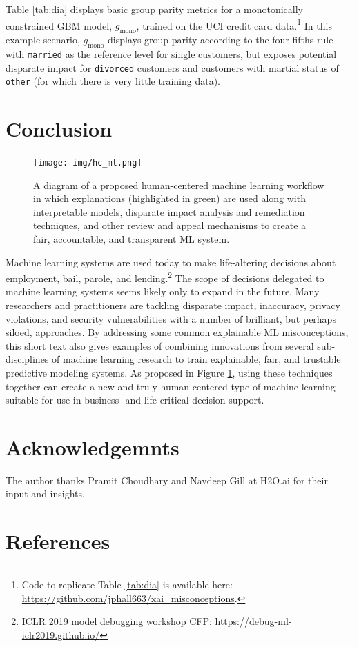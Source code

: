 \documentclass[fleqn]{article}
\begin{document}
Table \ref{tab:dia} displays basic group parity metrics for a monotonically constrained GBM model, $g_{\text{mono}}$, trained on the UCI credit card data.\footnote{Code to replicate Table \ref{tab:dia} is available here: \url{https://github.com/jphall663/xai_misconceptions}.} In this example scenario, $g_{\text{mono}}$ displays group parity according to the four-fifths rule with \texttt{married} as the reference level for single customers, but exposes potential disparate impact for \texttt{divorced} customers and customers with martial status of \texttt{other} (for which there is very little training data).

\section*{Conclusion}

\begin{figure}
	\begin{center}
		\texttt{[image: img/hc\_ml.png]}
		\caption{A diagram of a proposed human-centered machine learning workflow in which explanations (highlighted in green) are used along with interpretable models, disparate impact analysis and remediation techniques, and other review and appeal mechanisms to create a fair, accountable, and transparent ML system.}
		\label{fig:hc_ml}
	\end{center}
\end{figure}

Machine learning systems are used today to make life-altering decisions about employment, bail, parole, and lending.\footnote{ICLR 2019 model debugging workshop CFP: \url{https://debug-ml-iclr2019.github.io/}} The scope of decisions delegated to machine learning systems seems likely only to expand in the future. Many researchers and practitioners are tackling disparate impact, inaccuracy, privacy violations, and security vulnerabilities with a number of brilliant, but perhaps siloed, approaches. By addressing some common explainable ML misconceptions, this short text also gives examples of combining innovations from several sub-disciplines of machine learning research to train explainable, fair, and trustable predictive modeling systems. As proposed in Figure \ref{fig:hc_ml}, using these techniques together can create a new and truly human-centered type of machine learning suitable for use in business- and life-critical decision support. 

\section*{Acknowledgemnts}

The author thanks Pramit Choudhary and Navdeep Gill at H2O.ai for their input and insights. 

\section*{References}


\end{document}
